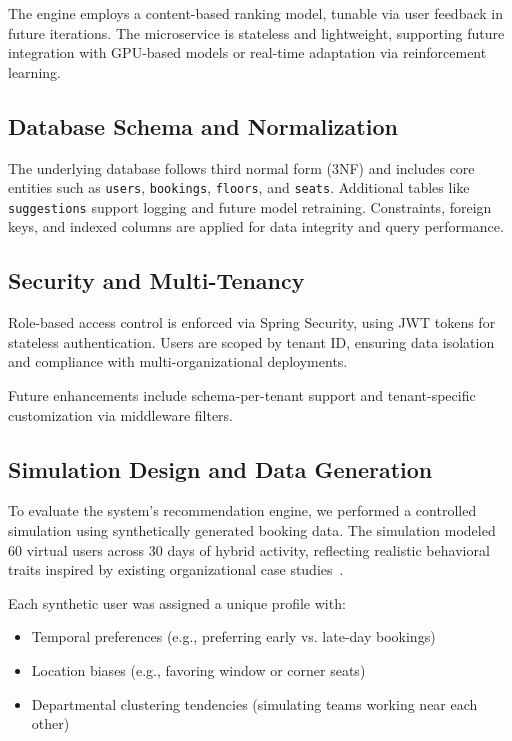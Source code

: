 \documentclass[onecolumn, 12pt]{IEEEtran}
\begin{document}
The engine employs a content-based ranking model, tunable via user feedback in future iterations. The microservice is stateless and lightweight, supporting future integration with GPU-based models or real-time adaptation via reinforcement learning.

\subsection{Database Schema and Normalization}

The underlying database follows third normal form (3NF) and includes core entities such as \texttt{users}, \texttt{bookings}, \texttt{floors}, and \texttt{seats}. Additional tables like \texttt{suggestions} support logging and future model retraining. Constraints, foreign keys, and indexed columns are applied for data integrity and query performance.

\subsection{Security and Multi-Tenancy}

Role-based access control is enforced via Spring Security, using JWT tokens for stateless authentication. Users are scoped by tenant ID, ensuring data isolation and compliance with multi-organizational deployments.

Future enhancements include schema-per-tenant support and tenant-specific customization via middleware filters.

\subsection{Simulation Design and Data Generation}

To evaluate the system's recommendation engine, we performed a controlled simulation using synthetically generated booking data. The simulation modeled 60 virtual users across 30 days of hybrid activity, reflecting realistic behavioral traits inspired by existing organizational case studies~\cite{nguyen2023predictive,vasudevan2023smart}.

Each synthetic user was assigned a unique profile with:
\begin{itemize}
    \item Temporal preferences (e.g., preferring early vs. late-day bookings)
    \item Location biases (e.g., favoring window or corner seats)
    \item Departmental clustering tendencies (simulating teams working near each other)
\end{itemize}
\end{document}
